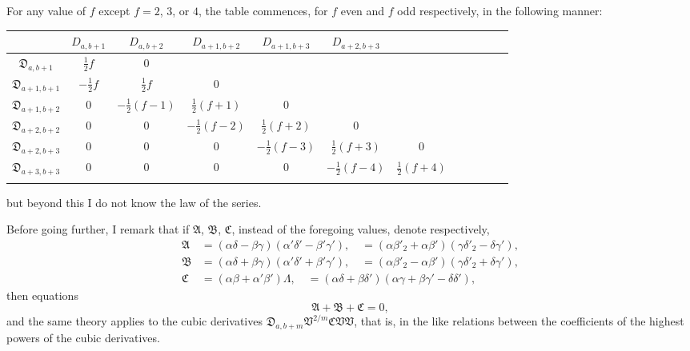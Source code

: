 \documentclass[12pt,a4paper]{article}
\theoremstyle{definition}
\begin{document}
\noindent For any value of $f$ except $f = 2$, $3$, or $4$, the table commences, for $f$ even and $f$ odd respectively, in the following manner:
\medskip

\begin{center}
\begin{tabular}{c|c|c|c|c|c|c|c|c|c|c|c}
& $D_{a,b+1}$ & $D_{a,b+2}$ & $D_{a+1,b+2}$ & $D_{a+1,b+3}$ & $D_{a+2,b+3}$ & & & & & & \\
\hline
$\mathfrak{D}_{a,b+1}$ & $\frac{1}{2}f$ & $0$ & & & & & & & & & \\
$\mathfrak{D}_{a+1,b+1}$ & $-\frac{1}{2}f$ & $\frac{1}{2}f$ & $0$ & & & & & & & & \\
$\mathfrak{D}_{a+1,b+2}$ & $0$ & $-\frac{1}{2}(f-1)$ & $\frac{1}{2}(f+1)$ & $0$ & & & & & & & \\
$\mathfrak{D}_{a+2,b+2}$ & $0$ & $0$ & $-\frac{1}{2}(f-2)$ & $\frac{1}{2}(f+2)$ & $0$ & & & & & & \\
$\mathfrak{D}_{a+2,b+3}$ & $0$ & $0$ & $0$ & $-\frac{1}{2}(f-3)$ & $\frac{1}{2}(f+3)$ & $0$ & & & & & \\
$\mathfrak{D}_{a+3,b+3}$ & $0$ & $0$ & $0$ & $0$ & $-\frac{1}{2}(f-4)$ & $\frac{1}{2}(f+4)$ & & & & & \\
& & & & & & & & & & &
\end{tabular}
\end{center}
\medskip

but beyond this I do not know the law of the series.

Before going further, I remark that if $\mathfrak{A}$, $\mathfrak{B}$, $\mathfrak{C}$, instead of the foregoing values, denote respectively,
\begin{align*}
\mathfrak{A} &= (\alpha\delta - \beta\gamma)(\alpha'\delta' - \beta'\gamma'), \quad = (\alpha\beta'_2 + \alpha\beta')(\gamma\delta'_2 - \delta\gamma'), \\
\mathfrak{B} &= (\alpha\delta + \beta\gamma)(\alpha'\delta' + \beta'\gamma'), \quad = (\alpha\beta'_2 - \alpha\beta')(\gamma\delta'_2 + \delta\gamma'), \\
\mathfrak{C} &= (\alpha\beta + \alpha'\beta')\Lambda, \quad = (\alpha\delta + \beta\delta')(\alpha\gamma + \beta\gamma' - \delta\delta'),
\end{align*}
then equations
\[
\mathfrak{A} + \mathfrak{B} + \mathfrak{C} = 0,
\]
and the same theory applies to the cubic derivatives $\mathfrak{D}_{a,b+m}\mathfrak{V}^{2/m}\mathfrak{C}\mathfrak{V}\mathfrak{V}$, that is, in the like relations between the coefficients of the highest powers of the cubic derivatives.
\end{document}
